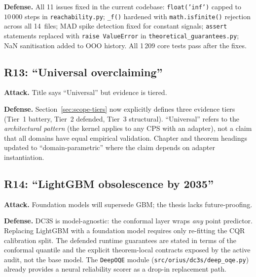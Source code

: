 \textbf{Defense.}  All 11 issues fixed in the current codebase:
\texttt{float('inf')} capped to $10\,000$ steps in \texttt{reachability.py};
\texttt{\_f()} hardened with \texttt{math.isfinite()} rejection across all
14~files; MAD spike detection fixed for constant signals; \texttt{assert}
statements replaced with \texttt{raise ValueError} in
\texttt{theoretical\_guarantees.py}; NaN sanitisation added to OOO history.
All 1\,209 core tests pass after the fixes.

\subsection{R13: ``Universal overclaiming''}
\textbf{Attack.}  Title says ``Universal'' but evidence is
tiered.

\textbf{Defense.}  Section~\ref{sec:scope-tiers} now explicitly defines
three evidence tiers (Tier~1 battery, Tier~2 defended, Tier~3 structural).
``Universal'' refers to the \emph{architectural pattern} (the kernel
applies to any CPS with an adapter), not a claim that all domains have
equal empirical validation.  Chapter and theorem headings updated to
``domain-parametric'' where the claim depends on adapter instantiation.

\subsection{R14: ``LightGBM obsolescence by 2035''}
\textbf{Attack.}  Foundation models will supersede GBM;
the thesis lacks future-proofing.

\textbf{Defense.}  DC3S is model-agnostic: the conformal layer wraps
\emph{any} point predictor.  Replacing LightGBM with a foundation model
requires only re-fitting the CQR calibration split.  The defended
runtime guarantees are stated in terms of the conformal quantile and the
explicit theorem-local contracts exposed by the active audit, not the base
model.  The \texttt{DeepOQE} module
(\texttt{src/orius/dc3s/deep\_oqe.py}) already provides a neural
reliability scorer as a drop-in replacement path.
